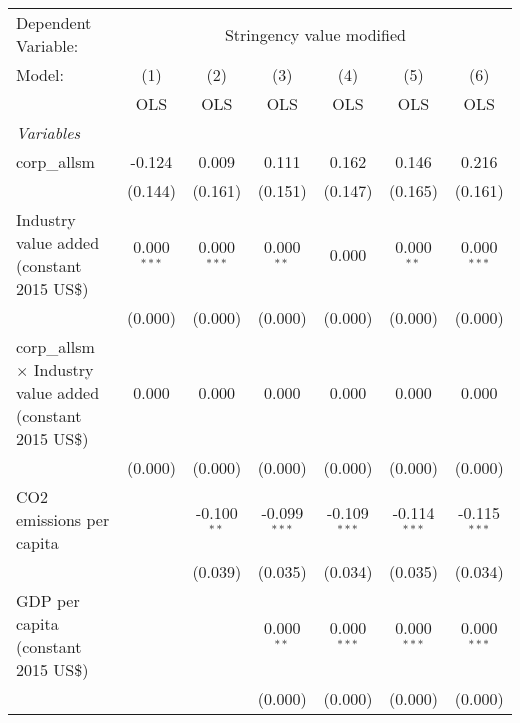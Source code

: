 
\begingroup
\centering
\begin{tabular}{lcccccc}
   \toprule
   Dependent Variable: & \multicolumn{6}{c}{Stringency value modified}\\
   Model:                                                            & (1)           & (2)           & (3)            & (4)            & (5)            & (6)\\  
                                                                     &  OLS          & OLS           & OLS            & OLS            & OLS            & OLS\\  
   \midrule
   \emph{Variables}\\
   corp\_allsm                                                       & -0.124        & 0.009         & 0.111          & 0.162          & 0.146          & 0.216\\   
                                                                     & (0.144)       & (0.161)       & (0.151)        & (0.147)        & (0.165)        & (0.161)\\   
   Industry value added (constant 2015 US\$)                         & 0.000$^{***}$ & 0.000$^{***}$ & 0.000$^{**}$   & 0.000          & 0.000$^{**}$   & 0.000$^{***}$\\   
                                                                     & (0.000)       & (0.000)       & (0.000)        & (0.000)        & (0.000)        & (0.000)\\   
   corp\_allsm $\times$ Industry value added (constant 2015 US\$)    & 0.000         & 0.000         & 0.000          & 0.000          & 0.000          & 0.000\\   
                                                                     & (0.000)       & (0.000)       & (0.000)        & (0.000)        & (0.000)        & (0.000)\\   
   CO2 emissions per capita                                          &               & -0.100$^{**}$ & -0.099$^{***}$ & -0.109$^{***}$ & -0.114$^{***}$ & -0.115$^{***}$\\   
                                                                     &               & (0.039)       & (0.035)        & (0.034)        & (0.035)        & (0.034)\\   
   GDP per capita (constant 2015 US\$)                               &               &               & 0.000$^{**}$   & 0.000$^{***}$  & 0.000$^{***}$  & 0.000$^{***}$\\   
                                                                     &               &               & (0.000)        & (0.000)        & (0.000)        & (0.000)\\   

\end{tabular}
